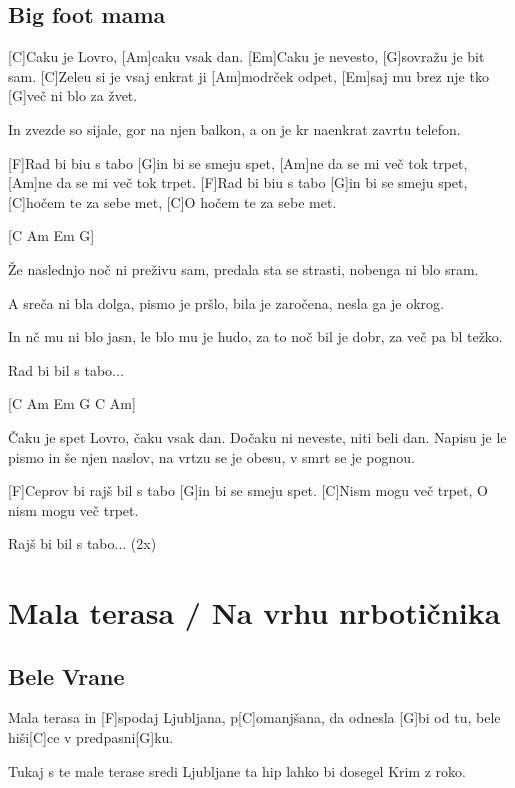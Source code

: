 \documentclass[a4paper,12pt]{article}
\begin{document}
\begin{multicols}{2}
\subsection*{Big foot mama}
\begin{guitar}
[C Am Em G] 

[C]Caku je Lovro, [Am]caku vsak dan.
[Em]Caku je nevesto, [G]sovražu je bit sam.
[C]Zeleu si je vsaj enkrat ji [Am]modrček odpet,
[Em]saj mu brez nje tko [G]več ni blo za žvet.


In zvezde so sijale, gor na njen balkon,
a on je kr naenkrat zavrtu telefon.


[F]Rad bi biu s tabo [G]in bi se smeju spet,
[Am]ne da se mi več tok trpet,
[Am]ne da se mi več tok trpet.
[F]Rad bi biu s tabo [G]in bi se smeju spet,
[C]hočem te za sebe met,
[C]O hočem te za sebe met.

[C Am Em G] 

Že naslednjo noč ni preživu sam, 
predala sta se strasti,
nobenga ni blo sram.


A sreča ni bla dolga, pismo je pršlo,
bila je zaročena, nesla ga je okrog.


In nč mu ni blo jasn, 
le blo mu je hudo, 
za to noč bil je dobr, 
za več pa bl težko.


Rad bi bil s tabo...
 
[C Am Em G C Am]

Čaku je spet Lovro, čaku vsak dan.
Dočaku ni neveste, niti beli dan.
Napisu je le pismo in še njen naslov,
na vrtzu se je obesu, v smrt se je pognou. 

                         
[F]Ceprov bi rajš bil s tabo 
[G]in bi se smeju spet.
[C]Nism mogu več trpet,
O nism mogu več trpet.


Rajš bi bil s tabo... (2x)

\end{guitar}
\section{Mala terasa / Na vrhu nrbotičnika}
\subsection*{Bele Vrane}
\begin{guitar}
[C]Mala terasa in 
[F]spodaj Ljubljana, p[C]omanjšana,
da odnesla [G]bi od tu,
bele hiši[C]ce v predpasni[G]ku.

 
Tukaj s te male terase 
sredi Ljubljane ta hip lahko
bi dosegel Krim z roko.



\end{guitar}
\end{multicols}
\end{document}
